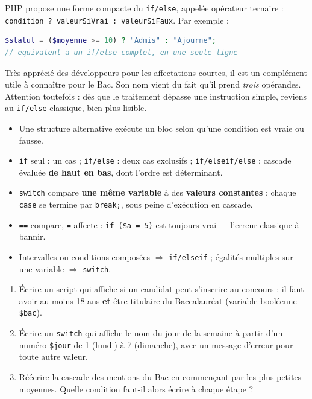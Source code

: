 \documentclass[11pt]{article}
\newcommand{\cle}[1]{{\popxbold\color{popdark}#1}}
\begin{document}
\begin{savaistu}
PHP propose une forme compacte du \texttt{if/else}, appelée \cle{opérateur ternaire} : \texttt{condition ? valeurSiVrai : valeurSiFaux}. Par exemple :
\begin{lstlisting}[language=Php]
$statut = ($moyenne >= 10) ? "Admis" : "Ajourne";
// equivalent a un if/else complet, en une seule ligne
\end{lstlisting}
Très apprécié des développeurs pour les affectations courtes, il est un complément utile à connaître pour le Bac. Son nom vient du fait qu'il prend \emph{trois} opérandes. Attention toutefois : dès que le traitement dépasse une instruction simple, reviens au \texttt{if/else} classique, bien plus lisible.
\end{savaistu}

\begin{aretenir}
\begin{itemize}
  \item Une \cle{structure alternative} exécute un bloc selon qu'une condition est vraie ou fausse.
  \item \texttt{if} seul : un cas ; \texttt{if/else} : deux cas exclusifs ; \texttt{if/elseif/else} : cascade évaluée \textbf{de haut en bas}, dont l'ordre est déterminant.
  \item \texttt{switch} compare \textbf{une même variable} à des \textbf{valeurs constantes} ; chaque \texttt{case} se termine par \texttt{break;}, sous peine d'exécution en cascade.
  \item \texttt{==} compare, \texttt{=} affecte : \texttt{if (\$a = 5)} est toujours vrai — l'erreur classique à bannir.
  \item Intervalles ou conditions composées $\Rightarrow$ \texttt{if/elseif} ; égalités multiples sur une variable $\Rightarrow$ \texttt{switch}.
\end{itemize}
\end{aretenir}

\begin{exercice}
\begin{enumerate}
  \item Écrire un script qui affiche si un candidat peut s'inscrire au concours : il faut avoir au moins 18 ans \textbf{et} être titulaire du Baccalauréat (variable booléenne \texttt{\$bac}).
  \item Écrire un \texttt{switch} qui affiche le nom du jour de la semaine à partir d'un numéro \texttt{\$jour} de 1 (lundi) à 7 (dimanche), avec un message d'erreur pour toute autre valeur.
  \item Réécrire la cascade des mentions du Bac en commençant par les plus petites moyennes. Quelle condition faut-il alors écrire à chaque étape ?
\end{enumerate}
\end{exercice}
\end{document}
